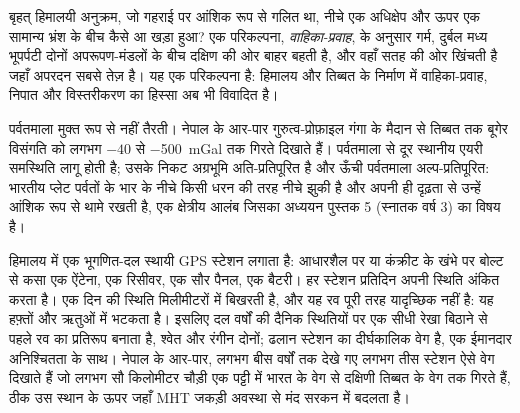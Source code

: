\begin{omfigure}
\par{}
\end{omfigure}

बृहत् हिमालयी अनुक्रम, जो गहराई पर आंशिक रूप से गलित था, नीचे एक अधिक्षेप और ऊपर एक सामान्य भ्रंश के
बीच कैसे आ खड़ा हुआ? एक परिकल्पना, \emph{वाहिका-प्रवाह}, के अनुसार गर्म,
दुर्बल मध्य भूपर्पटी दोनों अपरूपण-मंडलों के बीच दक्षिण की ओर बाहर बहती है, और वहाँ सतह की ओर खिंचती है
जहाँ अपरदन सबसे तेज़ है। यह एक परिकल्पना है: हिमालय और तिब्बत के निर्माण में वाहिका-प्रवाह, निपात
और विस्तरीकरण का हिस्सा अब भी विवादित है।

पर्वतमाला मुक्त रूप से नहीं तैरती। नेपाल के आर-पार गुरुत्व-प्रोफ़ाइल गंगा के मैदान से तिब्बत तक
बूगेर विसंगति को लगभग $-40$ से \qty{-500}{mGal} तक गिरते दिखाते हैं।
पर्वतमाला से दूर स्थानीय एयरी समस्थिति लागू होती है; उसके निकट अग्रभूमि अति-प्रतिपूरित है और ऊँची
पर्वतमाला अल्प-प्रतिपूरित: भारतीय प्लेट पर्वतों के भार के नीचे किसी धरन की तरह नीचे झुकी है
और अपनी ही दृढ़ता से उन्हें आंशिक रूप से थामे रखती है, एक क्षेत्रीय आलंब जिसका अध्ययन
पुस्तक 5 (स्नातक वर्ष 3) का विषय है।

\begin{inthefield}[चलती हुई पर्वत-पट्टी को मापना]
हिमालय में एक भूगणित-दल स्थायी GPS स्टेशन लगाता है: आधारशैल पर या
कंक्रीट के खंभे पर बोल्ट से कसा एक ऐंटेना, एक रिसीवर, एक सौर पैनल, एक बैटरी। हर स्टेशन प्रतिदिन अपनी
स्थिति अंकित करता है। एक दिन की स्थिति मिलीमीटरों में बिखरती है, और यह रव पूरी तरह
यादृच्छिक नहीं है: यह हफ़्तों और ऋतुओं में भटकता है। इसलिए दल वर्षों की दैनिक स्थितियों पर एक सीधी रेखा
बिठाने से पहले रव का प्रतिरूप बनाता है, श्वेत और रंगीन दोनों; ढलान
स्टेशन का दीर्घकालिक वेग है, एक ईमानदार अनिश्चितता के साथ। नेपाल के आर-पार, लगभग बीस वर्षों तक देखे गए
लगभग तीस स्टेशन ऐसे वेग दिखाते हैं जो लगभग सौ किलोमीटर चौड़ी एक पट्टी में भारत के वेग से दक्षिणी तिब्बत के वेग तक
गिरते हैं, ठीक उस स्थान के ऊपर जहाँ MHT जकड़ी अवस्था से
मंद सरकन में बदलता है।
\end{inthefield}

